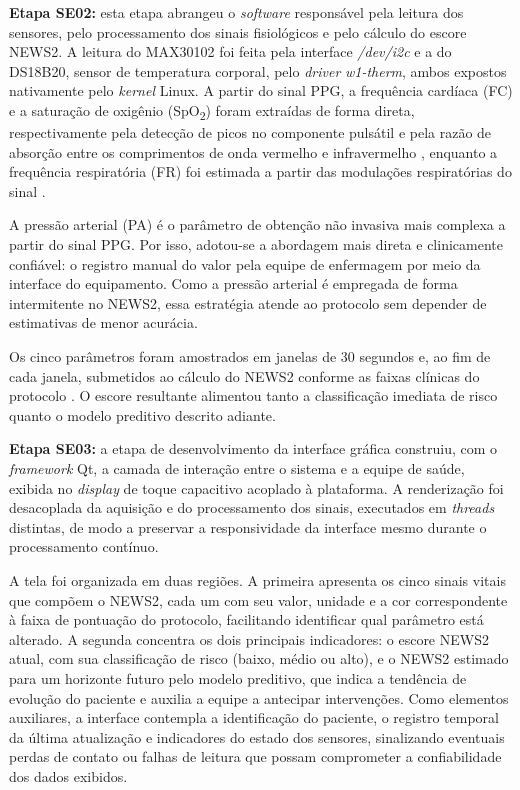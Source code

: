 \textbf{Etapa SE02:} esta etapa abrangeu o \textit{software} responsável pela leitura dos sensores, pelo processamento dos sinais fisiológicos e pelo cálculo do escore NEWS2. A leitura do MAX30102 foi feita pela interface \textit{/dev/i2c} e a do DS18B20, sensor de temperatura corporal, pelo \textit{driver} \textit{w1-therm}, ambos expostos nativamente pelo \textit{kernel} Linux. A partir do sinal PPG, a frequência cardíaca (FC) e a saturação de oxigênio (SpO\textsubscript{2}) foram extraídas de forma direta, respectivamente pela detecção de picos no componente pulsátil e pela razão de absorção entre os comprimentos de onda vermelho e infravermelho \cite{allen2007photoplethysmography}, enquanto a frequência respiratória (FR) foi estimada a partir das modulações respiratórias do sinal \cite{charlton2018breathing}.

A pressão arterial (PA) é o parâmetro de obtenção não invasiva mais complexa a partir do sinal PPG. Por isso, adotou-se a abordagem mais direta e clinicamente confiável: o registro manual do valor pela equipe de enfermagem por meio da interface do equipamento. Como a pressão arterial é empregada de forma intermitente no NEWS2, essa estratégia atende ao protocolo sem depender de estimativas de menor acurácia.

Os cinco parâmetros foram amostrados em janelas de 30 segundos e, ao fim de cada janela, submetidos ao cálculo do NEWS2 conforme as faixas clínicas do protocolo \cite{smith2013news}. O escore resultante alimentou tanto a classificação imediata de risco quanto o modelo preditivo descrito adiante.

\textbf{Etapa SE03:} a etapa de desenvolvimento da interface gráfica construiu, com o \textit{framework} Qt, a camada de interação entre o sistema e a equipe de saúde, exibida no \textit{display} de toque capacitivo acoplado à plataforma. A renderização foi desacoplada da aquisição e do processamento dos sinais, executados em \textit{threads} distintas, de modo a preservar a responsividade da interface mesmo durante o processamento contínuo.

A tela foi organizada em duas regiões. A primeira apresenta os cinco sinais vitais que compõem o NEWS2, cada um com seu valor, unidade e a cor correspondente à faixa de pontuação do protocolo, facilitando identificar qual parâmetro está alterado. A segunda concentra os dois principais indicadores: o escore NEWS2 atual, com sua classificação de risco (baixo, médio ou alto), e o NEWS2 estimado para um horizonte futuro pelo modelo preditivo, que indica a tendência de evolução do paciente e auxilia a equipe a antecipar intervenções. Como elementos auxiliares, a interface contempla a identificação do paciente, o registro temporal da última atualização e indicadores do estado dos sensores, sinalizando eventuais perdas de contato ou falhas de leitura que possam comprometer a confiabilidade dos dados exibidos.

